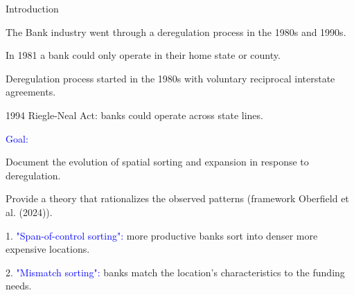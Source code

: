 \documentclass[notes,10pt, aspectratio=169]{beamer}
\newenvironment{wideitemize}{\itemize\addtolength{\itemsep}{10pt}}{\enditemize}
\begin{document}
\begin{frame}{Introduction}

\begin{wideitemize}
    \item The Bank industry went through a deregulation process in the 1980s and 1990s.
    \vspace{0.2cm}
    \begin{wideitemize}
    \item In 1981 a bank could only operate in their home state or county.
    \item Deregulation process started in the 1980s with voluntary reciprocal interstate agreements.
    \item 1994 Riegle-Neal Act: banks could operate across state lines.
    \end{wideitemize}
    \pause
    \item \textcolor{blue}{Goal:} 
    \begin{wideitemize}
        \item Document the evolution of spatial sorting and expansion in response to deregulation.

        \item Provide a theory that rationalizes the observed patterns (framework Oberfield et al. (2024)).
        \begin{wideitemize}
            \vspace{0.2cm}
            \item[1.] \textcolor{blue}{"Span-of-control sorting":} more productive banks sort into denser more expensive locations. %
            \item[2.] \textcolor{blue}{"Mismatch sorting":} banks match the location's characteristics to the funding needs.
        \end{wideitemize}

    \end{wideitemize}


    \end{wideitemize}

   \end{frame}
\end{document}
